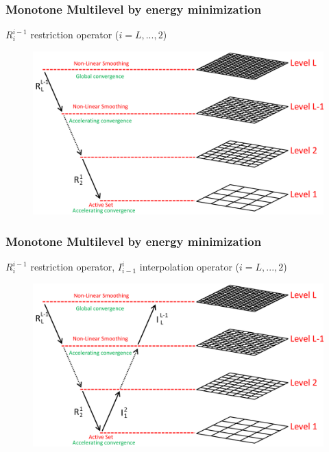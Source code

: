 \documentclass[8pt, oneside]{beamer}   	%
\newcommand{\titlecolor}[1]{\frametitle{\textcolor{dkgrey}{ \textbf{#1}}}}
\begin{document}
\begin{frame}
\titlecolor{Monotone Multilevel by energy minimization}
$R_{i}^{i-1}$ restriction operator ($ i=L,...,2 $)
\begin{figure}[htbp!]
		\centering
	\includegraphics[width=1\textwidth]{img/multigridexplained3.pdf}
\end{figure}
\end{frame}
\begin{frame}
\titlecolor{Monotone Multilevel by energy minimization}
$R_{i}^{i-1}$ restriction operator, $I_{i-1}^{i}$ interpolation operator ($ i=L,...,2 $)
\begin{figure}[htbp!]
		\centering
	\includegraphics[width=1\textwidth]{img/multigridexplained4.pdf}
\end{figure}
\end{frame}
\end{document}

